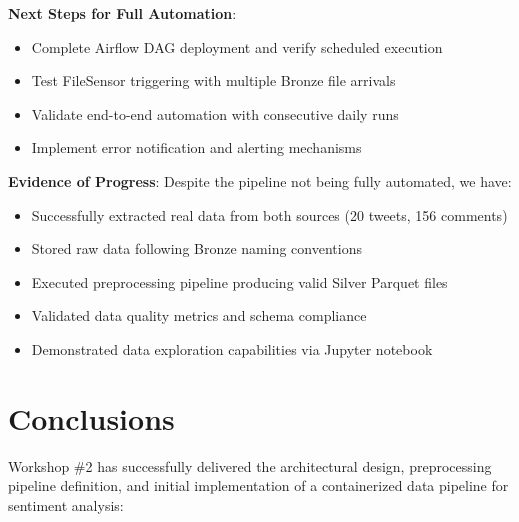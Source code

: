 \documentclass[11pt,a4paper]{article}
\begin{document}
\textbf{Next Steps for Full Automation}:
\begin{itemize}
    \item Complete Airflow DAG deployment and verify scheduled execution
    \item Test FileSensor triggering with multiple Bronze file arrivals
    \item Validate end-to-end automation with consecutive daily runs
    \item Implement error notification and alerting mechanisms
\end{itemize}

\textbf{Evidence of Progress}: Despite the pipeline not being fully automated, we have:
\begin{itemize}
    \item Successfully extracted real data from both sources (20 tweets, 156 comments)
    \item Stored raw data following Bronze naming conventions
    \item Executed preprocessing pipeline producing valid Silver Parquet files
    \item Validated data quality metrics and schema compliance
    \item Demonstrated data exploration capabilities via Jupyter notebook
\end{itemize}

\section{Conclusions}

Workshop \#2 has successfully delivered the architectural design, preprocessing pipeline definition, and initial implementation of a containerized data pipeline for sentiment analysis:
\end{document}
